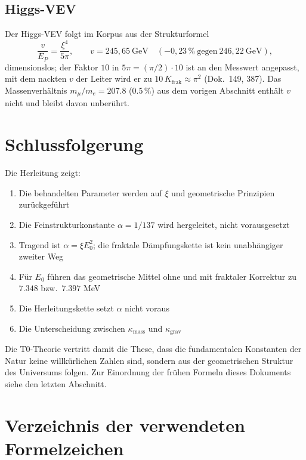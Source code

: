 \subsection{Higgs-VEV}

Der Higgs-VEV folgt im Korpus aus der Strukturformel
\begin{equation}
	\frac{v}{E_P} = \frac{\xi^4}{5\pi}, \qquad v = 245{,}65~\text{GeV} \quad (-0{,}23\,\%~\text{gegen}~246{,}22~\text{GeV}),
\end{equation}
dimensionslos; der Faktor $10$ in $5\pi = (\pi/2)\cdot10$ ist an den Messwert angepasst, mit dem nackten $v$ der Leiter wird er zu $10\,K_{\text{frak}}\approx\pi^2$ (Dok.~149, 387). Das Massenverhältnis $m_\mu/m_e = 207.8$ ($0.5\,\%$) aus dem vorigen Abschnitt enthält $v$ nicht und bleibt davon unberührt.

	\section{Schlussfolgerung}
	
	Die Herleitung zeigt:
	\begin{enumerate}
		\item Die behandelten Parameter werden auf $\xi$ und geometrische Prinzipien zurückgeführt
		\item Die Feinstrukturkonstante $\alpha = 1/137$ wird hergeleitet, nicht vorausgesetzt
		\item Tragend ist $\alpha = \xi E_0^2$; die fraktale Dämpfungskette ist kein unabhängiger zweiter Weg
		\item Für $E_0$ führen das geometrische Mittel ohne und mit fraktaler Korrektur zu $7.348$ bzw.\ $7.397$ MeV
		\item Die Herleitungskette setzt $\alpha$ nicht voraus
		\item Die Unterscheidung zwischen $\kappa_{\text{mass}}$ und $\kappa_{\text{grav}}$
	\end{enumerate}
	
	Die T0-Theorie vertritt damit die These, dass die fundamentalen Konstanten der Natur keine willkürlichen Zahlen sind, sondern aus der geometrischen Struktur des Universums folgen. Zur Einordnung der frühen Formeln dieses Dokuments siehe den letzten Abschnitt.

\appendix
\section{Verzeichnis der verwendeten Formelzeichen}
\label{app:symbols_de}

